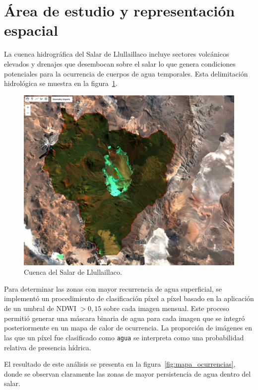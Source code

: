 \section{Área de estudio y representación espacial}

La cuenca hidrográfica del  Salar de Llullaillaco incluye sectores volcánicos elevados y drenajes que desembocan sobre el salar lo que genera condiciones potenciales para la ocurrencia de cuerpos de agua temporales. Esta delimitación hidrológica se muestra en la figura~\ref{fig:cuenca_llullaillaco}.


\begin{figure}[htpb]
	\centering
	\includegraphics[scale=.3]{Figures/fig5.png}
	\caption{Cuenca del Salar de Llullaillaco.}
	\label{fig:cuenca_llullaillaco}
\end{figure}

Para determinar las zonas con mayor recurrencia de agua superficial, se implementó un procedimiento de clasificación píxel a píxel basado en la aplicación de un umbral de NDWI $>0{,}15$ sobre cada imagen mensual. Este proceso permitió generar una máscara binaria de agua para cada imagen que se integró posteriormente en un mapa de calor de ocurrencia. La proporción de imágenes en las que un píxel fue clasificado como \texttt{agua} se interpreta como una probabilidad relativa de presencia hídrica.

El resultado de este análisis se presenta en la figura~\ref{fig:mapa_ocurrencias}, donde se observan claramente las zonas de mayor persistencia de agua dentro del salar.


